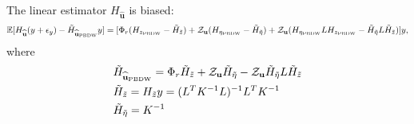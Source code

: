 \begin{rmk}
  The linear estimator $H_{\widehat{\mathbf{u}}}$ is biased:
  \begin{equation*}
    \mathbb{E}[H_{\widehat{\mathbf{u}}}(y+\epsilon_{y})-\Tilde{H}_{\widehat{\mathbf{u}}_{\text{PBDW}}}y] = [\Phi_r (H_{z_{\text{PBDW}}}-\Tilde{H}_{\Tilde{z}}) + \mathcal{Z}_{\mathbf u} (H_{\eta_{\text{PBDW}}}-\Tilde{H}_{\Tilde{\eta}}) + \mathcal{Z}_{\mathbf u} (H_{\eta_{\text{PBDW}}}LH_{z_{\text{PBDW}}}-\Tilde{H}_{\Tilde{\eta}}L\Tilde{H}_{\Tilde{z}})]y,
  \end{equation*}
  where 
  \begin{align*}
    &\Tilde{H}_{\widehat{\mathbf{u}}_{\text{PBDW}}} = \Phi_r \Tilde{H}_{\Tilde{z}}+\mathcal{Z}_{\mathbf u} \Tilde{H}_{\Tilde{\eta}}-\mathcal{Z}_{\mathbf u} \Tilde{H}_{\Tilde{\eta}}L\Tilde{H}_{\Tilde{z}}\\
    &\Tilde{H}_{\Tilde{z}}=H_{\Tilde{z}}y = (L^T K^{-1} L)^{-1} L^T K^{-1}\\
    &\Tilde{H}_{\Tilde{\eta}}= K^{-1}
  \end{align*}
\end{rmk}
